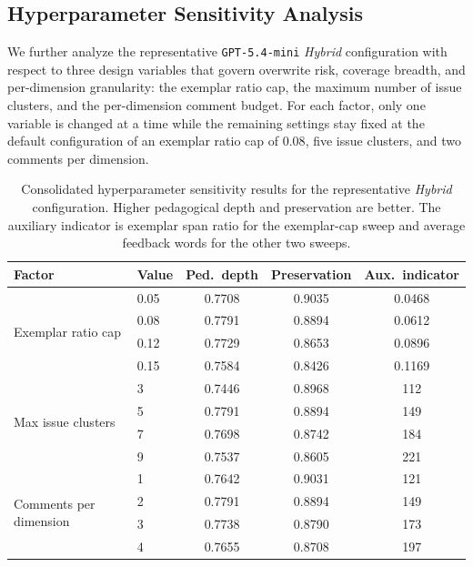 \documentclass[preprint,12pt]{elsarticle}
\begin{document}
\subsection{Hyperparameter Sensitivity Analysis}

We further analyze the representative \texttt{GPT-5.4-mini} \textit{Hybrid} configuration with respect to three design variables that govern overwrite risk, coverage breadth, and per-dimension granularity: the exemplar ratio cap, the maximum number of issue clusters, and the per-dimension comment budget. For each factor, only one variable is changed at a time while the remaining settings stay fixed at the default configuration of an exemplar ratio cap of $0.08$, five issue clusters, and two comments per dimension.

\begin{table}[t]
\centering
\scriptsize
\caption{Consolidated hyperparameter sensitivity results for the representative \textit{Hybrid} configuration. Higher pedagogical depth and preservation are better. The auxiliary indicator is exemplar span ratio for the exemplar-cap sweep and average feedback words for the other two sweeps.}
\label{tab:hyper_sensitivity_all}
\begin{tabular*}{\linewidth}{@{\extracolsep{\fill}}llccc@{}}
\toprule
Factor & Value & Ped.\ depth & Preservation & Aux.\ indicator \\
\midrule
\multirow{4}{*}{Exemplar ratio cap}
& 0.05 & 0.7708 & 0.9035 & 0.0468 \\
& 0.08 & 0.7791 & 0.8894 & 0.0612 \\
& 0.12 & 0.7729 & 0.8653 & 0.0896 \\
& 0.15 & 0.7584 & 0.8426 & 0.1169 \\
\midrule
\multirow{4}{*}{Max issue clusters}
& 3 & 0.7446 & 0.8968 & 112 \\
& 5 & 0.7791 & 0.8894 & 149 \\
& 7 & 0.7698 & 0.8742 & 184 \\
& 9 & 0.7537 & 0.8605 & 221 \\
\midrule
\multirow{4}{*}{Comments per dimension}
& 1 & 0.7642 & 0.9031 & 121 \\
& 2 & 0.7791 & 0.8894 & 149 \\
& 3 & 0.7738 & 0.8790 & 173 \\
& 4 & 0.7655 & 0.8708 & 197 \\
\bottomrule
\end{tabular*}
\end{table}
\end{document}
